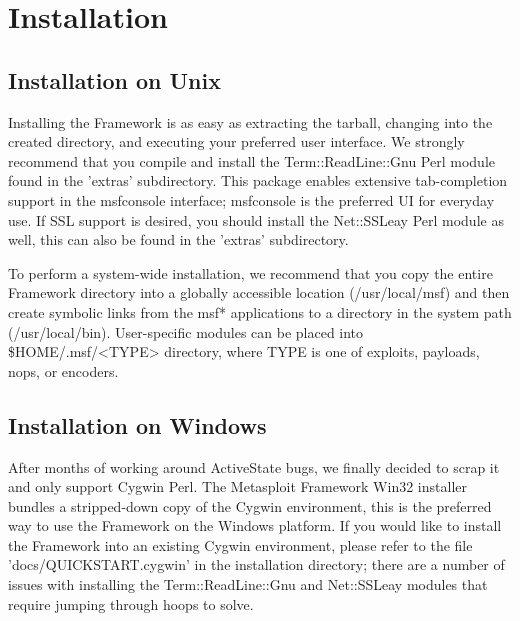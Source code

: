 \documentclass{report}
\begin{document}
\par
\pagebreak

\chapter{Installation}

    \section{Installation on Unix}
    \label{INSTALL-UNIX}
\par
Installing the Framework is as easy as extracting the tarball, changing into the
created directory, and executing your preferred user interface. We strongly
recommend that you compile and install the Term::ReadLine::Gnu Perl module found
in the 'extras' subdirectory. This package enables extensive tab-completion
support in the msfconsole interface; msfconsole is the preferred UI for everyday
use.  If SSL support is desired, you should install the Net::SSLeay Perl module
as well, this can also be found in the 'extras' subdirectory.  

\par
To perform a system-wide installation, we recommend that you copy the entire
Framework directory into a globally accessible location (/usr/local/msf) and
then create symbolic links from the msf* applications to a directory in the
system path (/usr/local/bin). User-specific modules can be placed into
\$HOME/.msf/<TYPE> directory, where TYPE is one of exploits, payloads, nops, or
encoders. 

    \section{Installation on Windows}
    \label{INSTALL-WIN32}
\par
After months of working around ActiveState bugs, we finally decided to scrap it
and only support Cygwin Perl. The Metasploit Framework Win32 installer bundles a
stripped-down copy of the Cygwin environment, this is the preferred way to use
the Framework on the Windows platform. If you would like to install the
Framework into an existing Cygwin environment, please refer to the file
'docs/QUICKSTART.cygwin' in the installation directory; there are a number of
issues with installing the Term::ReadLine::Gnu and Net::SSLeay modules that
require jumping through hoops to solve.  
   
\end{document}
